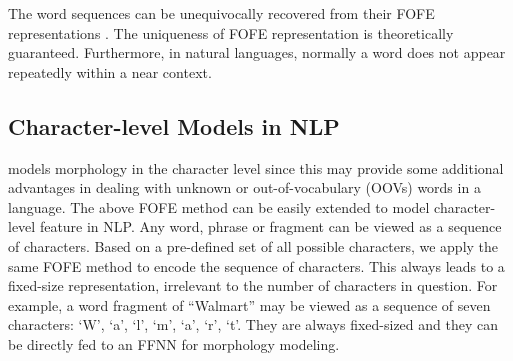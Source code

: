 \documentclass[11pt,a4paper]{article}
\newtheorem{theorem}{Theorem}
\begin{document}
The word sequences can be unequivocally recovered from their FOFE representations \cite{zhang2015fixed}.
The uniqueness of FOFE representation is theoretically guaranteed.
Furthermore, in natural languages, normally a word does not appear repeatedly within a near context. 


\subsection {Character-level Models in NLP}
\label{subsec_char_feature}

 models morphology in the character level since this may provide some additional advantages in dealing with unknown or out-of-vocabulary (OOVs) words in a language.
The above FOFE method can be easily extended to model character-level feature in NLP. Any word, phrase or fragment can be viewed as a sequence of characters. Based on a pre-defined set of all possible characters, we apply the same FOFE method to encode the sequence of characters. This always leads to a fixed-size representation, irrelevant to the number of characters in question. 
For example, a word fragment of ``Walmart'' may be viewed as a 
sequence of seven characters: `W', `a', `l', `m', `a', `r', `t'.
They are
always fixed-sized and they can be directly fed to an FFNN for morphology modeling. 
\end{document}
